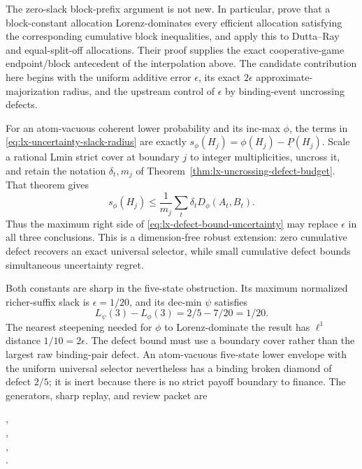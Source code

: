 The zero-slack block-prefix argument is not new.  In particular,
\citet[Proposition~2]{SanchezSorianoBranzeiLlorcaTijs2010} prove that a
block-constant allocation Lorenz-dominates every efficient allocation
satisfying the corresponding cumulative block inequalities, and apply this
to Dutta--Ray and equal-split-off allocations.  Their proof supplies the
exact cooperative-game endpoint/block antecedent of the interpolation above.
The candidate contribution here begins with the uniform additive error
$\epsilon$, its exact $2\epsilon$ approximate-majorization radius, and the
upstream control of $\epsilon$ by binding-event uncrossing defects.

For an atom-vacuous coherent lower probability and its inc-max $\phi$, the
terms in \eqref{eq:lx-uncertainty-slack-radius} are exactly
$s_\phi(H_j)=\phi(H_j)-\underline P(H_j)$.  Scale a rational Lmin strict
cover at boundary $j$ to integer multiplicities, uncross it, and retain the
notation $\delta_t,m_j$ of Theorem~\ref{thm:lx-uncrossing-defect-budget}.
That theorem gives
\[
 s_\phi(H_j)\leq
 \frac1{m_j}\sum_t\delta_tD_\phi(A_t,B_t).             \tag{DBU}
 \label{eq:lx-defect-bound-uncertainty}
\]
Thus the maximum right side of
\eqref{eq:lx-defect-bound-uncertainty} may replace $\epsilon$ in all three
conclusions.  This is a dimension-free robust extension: zero cumulative
defect recovers an exact universal selector, while small cumulative defect
bounds simultaneous uncertainty regret.

Both constants are sharp in the five-state obstruction.  Its maximum
normalized richer-suffix slack is $\epsilon=1/20$, and its dec-min $\psi$
satisfies
\[
 L_\psi(3)-L_\phi(3)=2/5-7/20=1/20.
\]
The nearest steepening needed for $\phi$ to Lorenz-dominate the result has
$\ell^1$ distance $1/10=2\epsilon$.  The defect bound must use a boundary
cover rather than the largest raw binding-pair defect.  An atom-vacuous
five-state lower envelope with the uniform universal selector nevertheless
has a binding broken diamond of defect $2/5$; it is inert because there is no
strict payoff boundary to finance.  The generators, sharp replay, and
review packet are
\begin{center}
\small{},\\[-2pt]
\small{},\\[-2pt]
\small{},\\[-2pt]
\small{}.
\end{center}

